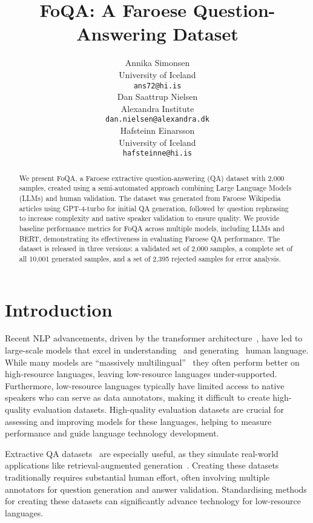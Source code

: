 \documentclass[11pt]{article}
\title{FoQA: A Faroese Question-Answering Dataset}
\author{
    Annika Simonsen \\
    University of Iceland \\
    {\tt ans72@hi.is} \\\And
    Dan Saattrup Nielsen \\
    Alexandra Institute \\
    {\tt dan.nielsen@alexandra.dk} \\\And
    Hafsteinn Einarsson \\
    University of Iceland \\
    {\tt hafsteinne@hi.is}
}
\date{}
\begin{document}
\maketitle
\begin{abstract}
  We present FoQA, a Faroese extractive question-answering (QA) dataset with 2,000
  samples, created using a semi-automated approach combining Large Language Models
  (LLMs) and human validation. The dataset was generated from Faroese Wikipedia articles
  using GPT-4-turbo for initial QA generation, followed by question rephrasing to
  increase complexity and native speaker validation to ensure quality. We provide
  baseline performance metrics for FoQA across multiple models, including LLMs and BERT,
  demonstrating its effectiveness in evaluating Faroese QA performance. The dataset is
  released in three versions: a validated set of 2,000 samples, a complete set of all
  10,001 generated samples, and a set of 2,395 rejected samples for error analysis.
\end{abstract}

\section{Introduction}
\label{sec:introduction}

Recent NLP advancements, driven by the transformer
architecture~\cite{vaswani2017attention}, have led to large-scale models that excel in
understanding~\cite{devlin2018bert} and generating~\cite{brown2020language} human
language. While many models are ``massively
multilingual''~\cite{conneau2019unsupervised,he2021debertav3,brown2020language} they
often perform better on high-resource languages, leaving low-resource languages
under-supported. Furthermore, low-resource languages typically have limited access to
native speakers who can serve as data annotators, making it difficult to create
high-quality evaluation datasets. High-quality evaluation datasets are crucial for
assessing and improving models for these languages, helping to measure performance and
guide language technology development.

Extractive QA datasets~\cite{srivastava2024towards} are especially useful, as they
simulate real-world applications like retrieval-augmented
generation~\cite{gao2023retrieval}. Creating these datasets traditionally requires
substantial human effort, often involving multiple annotators for question generation
and answer validation. Standardising methods for creating these datasets can
significantly advance technology for low-resource languages.
\end{document}
